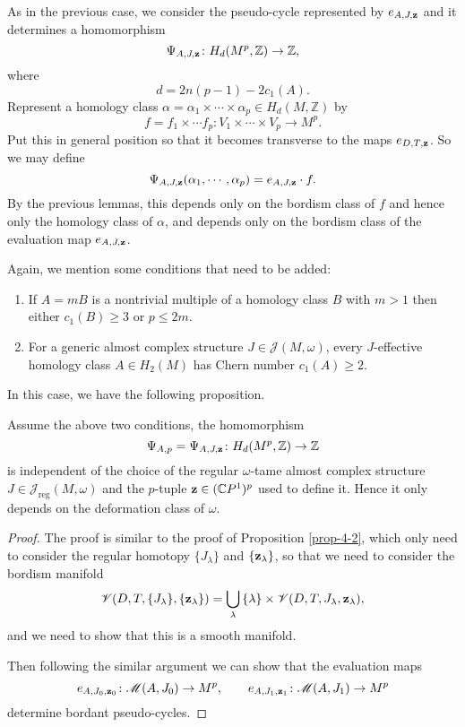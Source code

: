 \documentclass[twoside]{article}
\begin{document}
As in the previous case, we consider the pseudo-cycle represented by $e_{A,J,\mathbf{z}}$ 
and it determines a homomorphism
\[\Psi_{A,J,\mathbf{z}}\colon H_d(M^p,\mathbb{Z})\rightarrow \mathbb{Z},\]
where
\[d=2n(p-1)-2c_1(A).\]
Represent a homology class $\alpha=\alpha_1\times\cdots\times\alpha_p\in H_d(M,\mathbb{Z})$ by 
\[f=f_1\times\cdots f_p\colon V_1\times\cdots\times V_p\rightarrow M^p.\]
Put this in general position so that it becomes transverse to the maps $e_{D,T,\mathbf{z}}$.
So we may define
\[\Psi_{A,J,\mathbf{z}}(\alpha_1,\cdots,\alpha_p)=e_{A,J,\mathbf{z}}\cdot f.\]
By the previous lemmas, this depends only on the bordism class of $f$ 
and hence only the homology class of $\alpha$, 
and depends only on the bordism class of the evaluation map $e_{A,J,\mathbf{z}}$.

Again, we mention some conditions that need to be added:

\begin{enumerate}
    \item If $A=mB$ is a nontrivial multiple of a homology class $B$ 
    with $m>1$ then either $c_1(B)\geq 3$ or $p\leq 2m$.
    \item For a generic almost complex structure $J\in\mathscr{J}(M,\omega)$, 
    every $J$-effective homology class $A\in H_2(M)$ has Chern number $c_1(A)\geq 2$.
\end{enumerate}

In this case, we have the following proposition.

\begin{proposition}
    Assume the above two conditions, the homomorphism
    \[\Psi_{A,p}=\Psi_{A,J,\mathbf{z}}\colon H_d(M^p,\mathbb{Z})\rightarrow \mathbb{Z}\]
    is independent of the choice of the regular $\omega$-tame almost complex structure 
    $J\in \mathscr{J}_{\mathrm{reg}}(M,\omega)$ and the $p$-tuple $\mathbf{z}\in (\mathbb{C}P^{1})^p$ used to define it. 
    Hence it only depends on the deformation class of $\omega$.
\end{proposition}

\begin{proof}
    The proof is similar to the proof of Proposition \ref{prop-4-2}, 
    which only need to consider the regular homotopy $\{J_\lambda\}$ and $\{\mathbf{z}_\lambda\}$, 
    so that we need to consider the bordism manifold
    \[\mathscr{V}(D,T,\{J_\lambda\},\{\mathbf{z}_\lambda\})=\bigcup_{\lambda}{}\{\lambda\}\times\mathscr{V}(D,T,J_\lambda,\mathbf{z}_\lambda),\]
    and we need to show that this is a smooth manifold.
    
    Then following the similar argument we can show that the evaluation maps
    \[e_{A,J_0,\mathbf{z}_0}\colon \mathscr{M}(A,J_0)\rightarrow M^p, \qquad e_{A,J_1,\mathbf{z}_1}\colon \mathscr{M}(A,J_1)\rightarrow M^p\]
    determine bordant pseudo-cycles.
\end{proof}
\end{document}
